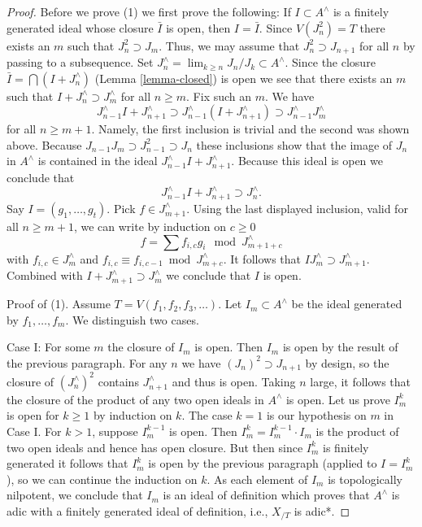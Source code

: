 \begin{proof}
\medskip\noindent
Before we prove (1) we first prove the following: If $I \subset A^\wedge$ is
a finitely generated ideal whose closure $\bar I$ is open, then $I = \bar I$.
Since $V(J_n^2) = T$ there exists an $m$ such that $J_n^2 \supset J_m$.
Thus, we may assume that $J_n^2 \supset J_{n + 1}$ for all $n$ by passing
to a subsequence. Set $J_n^\wedge = \lim_{k \geq n} J_n/J_k \subset A^\wedge$.
Since the closure $\bar I = \bigcap (I + J_n^\wedge)$
(Lemma \ref{lemma-closed}) is open we see that there exists an $m$ such that
$I + J_n^\wedge \supset J_m^\wedge$ for all $n \geq m$. Fix such an $m$.
We have
$$
J_{n - 1}^\wedge I + J_{n + 1}^\wedge \supset
J_{n - 1}^\wedge (I + J_{n + 1}^\wedge) \supset
J_{n - 1}^\wedge J_m^\wedge
$$
for all $n \geq m + 1$. Namely, the first inclusion is trivial and the
second was shown above. Because $J_{n - 1}J_m \supset J_{n - 1}^2 \supset J_n$
these inclusions show that the image of $J_n$ in $A^\wedge$
is contained in the ideal $J_{n - 1}^\wedge I + J_{n + 1}^\wedge$.
Because this ideal is open we conclude that
$$
J_{n - 1}^\wedge I + J_{n + 1}^\wedge \supset J_n^\wedge.
$$
Say $I = (g_1, \ldots, g_t)$. Pick $f \in J_{m + 1}^\wedge$.
Using the last displayed inclusion, valid for all $n \geq m + 1$,
we can write by induction on $c \geq 0$
$$
f = \sum f_{i, c} g_i \mod J_{m + 1+ c}^\wedge
$$
with $f_{i, c} \in J_m^\wedge$ and
$f_{i, c} \equiv f_{i, c - 1} \bmod J_{m + c}^\wedge$.
It follows that $IJ_m^\wedge \supset J_{m + 1}^\wedge$.
Combined with $I + J_{m + 1}^\wedge \supset J_m^\wedge$
we conclude that $I$ is open.

\medskip\noindent
Proof of (1). Assume $T = V(f_1, f_2, f_3, \ldots)$.
Let $I_m \subset A^\wedge$ be the ideal generated by $f_1, \ldots, f_m$.
We distinguish two cases.

\medskip\noindent
Case I: For some $m$ the closure of $I_m$ is open.
Then $I_m$ is open by the result of the previous paragraph.
For any $n$ we have $(J_n)^2 \supset J_{n+1}$ by design, so
the closure of $(J_n^\wedge)^2$ contains $J_{n+1}^\wedge$
and thus is open.  Taking $n$ large, it follows that the closure
of the product of any two open ideals in $A^\wedge$ is open.
Let us prove $I_m^k$ is open for $k \ge 1$ by induction on $k$.
The case $k = 1$ is our hypothesis on $m$ in Case I.
For $k > 1$, suppose $I_m^{k - 1}$ is open. Then
$I_m^k = I_m^{k - 1} \cdot I_m$ is the product of two open ideals
and hence has open closure. But then since $I_m^k$
is finitely generated it follows that $I_m^k$
is open by the previous paragraph (applied to $I = I_m^k$),
so we can continue the induction on $k$.
As each element of $I_m$ is topologically nilpotent, we conclude
that $I_m$ is an ideal of definition which proves that $A^\wedge$
is adic with a finitely generated ideal of definition, i.e.,
$X_{/T}$ is adic*.


\end{proof}
